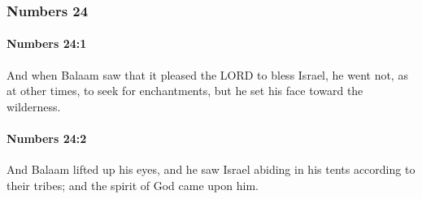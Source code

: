 	\subsubsection{Numbers 24} %
		\label{NUMBERS-24}

		\paragraph{Numbers 24:1} %
			\label{NUMBERS-24-1}

			And when Balaam saw that it pleased the LORD to bless Israel, he went not, as at other times, to seek for enchantments, but he set his face toward the wilderness.


		\paragraph{Numbers 24:2} %
			\label{NUMBERS-24-2}

			And Balaam lifted up his eyes, and he saw Israel abiding in his tents according to their tribes; and the spirit of God came upon him.


